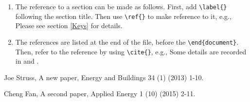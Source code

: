 \documentclass[14pt]{article}
\begin{document}
\begin{enumerate}
 \item The reference to a section can be made as follows. First, add \texttt{\textbackslash label\{\}} following the section title. Then use \texttt{\textbackslash ref\{\}} to make reference to it, e.g., Please see section \ref{Keys} for details.
 
 \item The references are listed at the end of the file, before the \texttt{\textbackslash end\{document\}}. Then, refer to the reference by using \texttt{\textbackslash cite\{\}}, e.g., Some details are recorded in \cite{A} and \cite{B}.

\end{enumerate}


\begin{thebibliography}{9}
  Joe Struss, A new paper, Energy and Buildings 34 (1) (2013) 1-10.
 
  Cheng Fan, A second paper, Applied Energy 1 (10) (2015) 2-11.
\end{thebibliography}
\end{document}
